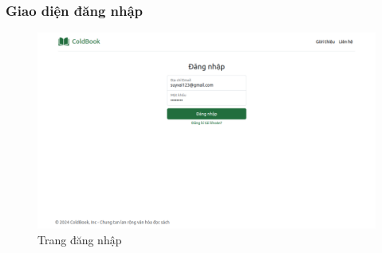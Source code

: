 \subsubsection{Giao diện đăng nhập}
\begin{figure}[H]
  \centering
  \includegraphics[width=1\textwidth]{report/images/client/c_dangnhap.png}
  \caption{Trang đăng nhập}
\end{figure}